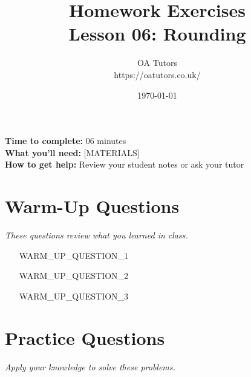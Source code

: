 \documentclass[a4paper,12pt]{article}
\begin{document}
\title{\textcolor{oablue}{\Huge Homework Exercises} \\ 
       \textcolor{oablue}{\Large Lesson 06: Rounding}}
\author{\textcolor{oablue}{OA Tutors} \\ 
        \textcolor{oagray}{https://oatutors.co.uk/}}
\date{\textcolor{oagray}{\today}}

\maketitle

\begin{instruction}
\textbf{Time to complete:} 06 minutes \\
\textbf{What you'll need:} [MATERIALS] \\
\textbf{How to get help:} Review your student notes or ask your tutor
\end{instruction}

\section{Warm-Up Questions}
\textit{These questions review what you learned in class.}

\begin{enumerate}
    \item [WARM_UP_QUESTION_1]
    
    \vspace{2cm}
    
    \item [WARM_UP_QUESTION_2]
    
    \vspace{2cm}
    
    \item [WARM_UP_QUESTION_3]
    
    \vspace{2cm}
\end{enumerate}

\section{Practice Questions}
\textit{Apply your knowledge to solve these problems.}
\end{document}
